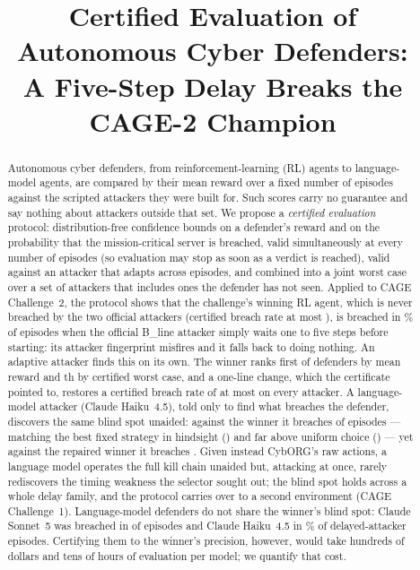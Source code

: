 \documentclass[conference,compsoc]{IEEEtran}
\begin{document}
\title{Certified Evaluation of Autonomous Cyber Defenders:\\
A Five-Step Delay Breaks the CAGE-2 Champion}
\author{}
\maketitle

\begin{abstract}
Autonomous cyber defenders, from reinforcement-learning (RL) agents to language-model
agents, are compared by their mean reward over a fixed number of episodes against the
scripted attackers they were built for. Such scores carry no guarantee and say nothing
about attackers outside that set. We propose a \emph{certified evaluation} protocol:
distribution-free confidence bounds on a defender's reward and on the probability that
the mission-critical server is breached, valid simultaneously at every number of
episodes (so evaluation may stop as soon as a verdict is reached), valid against an
attacker that adapts across episodes, and combined into a joint worst case over a set of
attackers that includes ones the defender has not seen. Applied to CAGE Challenge~2,
the protocol shows that the challenge's winning RL agent, which is never breached by
the two official attackers (certified breach rate at most \CgChampSeenBreachUp), is
breached in \CgChampDelayedBreach\% of episodes when the official B\_line attacker
simply waits one to five steps before starting: its attacker fingerprint misfires and it
falls back to doing nothing. An adaptive attacker finds this on its own. The winner ranks
first of \CgDefenders{} defenders by mean reward and \CgChampRankCert{}th by certified worst case, and
a one-line change, which the certificate pointed to, restores a certified breach rate of
at most \CgFixAllBreachCert{} on every attacker. A language-model attacker (Claude Haiku~4.5),
told only to find what breaches the defender, discovers the same blind spot unaided:
against the winner it breaches \AhChampBreach{} of episodes --- matching the best fixed
strategy in hindsight (\AhChampBest) and far above uniform choice (\AhChampRand) --- yet
against the repaired winner it breaches \AhFixBreach. Given instead CybORG's raw actions, a
language model operates the full kill chain unaided but, attacking at once, rarely
rediscovers the timing weakness the selector sought out; the blind spot holds across a whole delay family, and the
protocol carries over to a second environment (CAGE Challenge~1). Language-model defenders do not share the
winner's blind spot: Claude Sonnet~5 was breached in \SnBreaches{} of \SnEpisodes{} episodes
and Claude Haiku~4.5 in \HnDelayedBreach\% of delayed-attacker episodes. Certifying them to
the winner's precision, however, would take hundreds of dollars and tens of hours of
evaluation per model; we quantify that cost.
\end{abstract}
\end{document}
